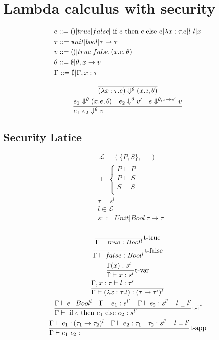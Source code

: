 \documentclass{article}
\begin{document}
\section{Lambda calculus with security}
\begin{align*}
    & e ::= () | true | false | \text{ if } e \text{ then } e \text{ else } e | \lambda x:\tau.e | l\ l|x \\
    & \tau ::= unit | bool | \tau\to\tau \\
    & v ::= () | true | false | (x.e, \theta) \\
    & \theta::= \emptyset | \theta,x\to v \\
    & \Gamma ::= \emptyset | \Gamma,x:\tau \\
\end{align*}
\begin{gather*}
    \st[]{
        (\lam{x:\tau}{e})\Da^\theta (x.e,\theta)
    }{} \\
    \st[]{
        e_1\ e_2 \Da^\theta v
    }{
        e_1 \Da^\theta(x.e,\theta) \quad e_2\Da^\theta v' \quad e\Da^{\theta,x\to v'} v
    } \\
\end{gather*}

\subsection{Security Latice}
\begin{gather*}
    \mathcal L = (\{P,S\}, \sqsubseteq) \\
    \sqsubseteq \begin{cases}
        P \sqsubseteq P \\
        P \sqsubseteq S \\
        S \sqsubseteq S \\
    \end{cases}
\end{gather*}
\begin{align*}
    & \tau = s^l \\
    & l \in \mathcal L \\
    & s ::= Unit| Bool | \tau\to\tau \\
\end{align*}

\begin{gather*}
    \st[t-true]{
        \Gamma \vdash true: Bool^l
    }{} \\
    \st[t-false]{
        \Gamma \vdash false: Bool^l
    }{} \\
    \st[t-var]{
        \Gamma \vdash x: s^l
    }{
        \Gamma(x):s^l
    } \\
    \st[]{
        \Gamma\vdash(\lam{x:\tau}{l}): (\tau\to\tau')^l
    }{
        \Gamma,x:\tau \vdash l:\tau'
    } \\
    \st[t-if]{
        \Gamma\vdash \IF e \THEN e_1 \ELSE e_2: s^{l'}
    }{
        \Gamma\vdash e:Bool^l \quad
        \Gamma\vdash e_1:s^{l'} \quad
        \Gamma\vdash e_2:s^{l'} \quad
        l\sqsubseteq l'
    } \\
    \st[t-app]{
        \Gamma\vdash e_1\ e_2:
    }{
        \Gamma\vdash e_1:(\tau_1\to\tau_2)^l \quad
        \Gamma\vdash e_2:\tau_1 \quad
        \tau_2:s^{l'} \quad
        l\sqsubseteq l'
    }
\end{gather*}
\end{document}
